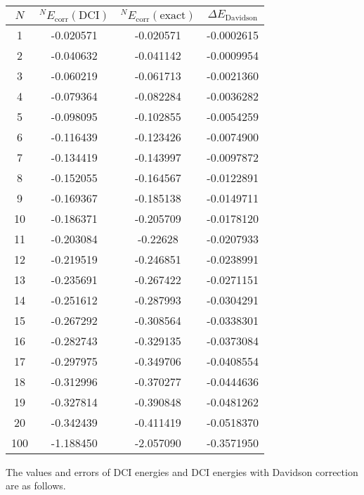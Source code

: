 \documentclass[a4paper]{article}
\DeclareMathOperator{\corr}{\mathrm{corr}}
\numberwithin{equation}{subsection}
\begin{document}
\begin{table}[H]
	\begin{tabular}{cccc}
	\hline
	\specialrule{0em}{1pt}{2pt}
	$ N $ & $ {^N E}_{\corr}(\text{DCI}) $ & $ {^N E}_{\corr}(\text{exact}) $ & $ \Delta E_{\text{Davidson}} $  \\ \hline
    1 & -0.020571	& -0.020571 &  -0.0002615 \\
    2 & -0.040632	& -0.041142 &  -0.0009954 \\
    3 & -0.060219	& -0.061713 &  -0.0021360	 \\
    4 & -0.079364	& -0.082284 &  -0.0036282	 \\
    5 & -0.098095	& -0.102855	 & -0.0054259	 \\
    6 & -0.116439	& -0.123426	 & -0.0074900	 \\
    7 & -0.134419	& -0.143997	 & -0.0097872	 \\
    8 & -0.152055	& -0.164567	 & -0.0122891	 \\
    9 & -0.169367	& -0.185138	 & -0.0149711	 \\
    10 & -0.186371	& -0.205709	 & -0.0178120	 \\
    11 & -0.203084	& -0.22628	 & -0.0207933	 \\
    12 & -0.219519	& -0.246851	 & -0.0238991	 \\
    13 & -0.235691	& -0.267422	 & -0.0271151	 \\
    14 & -0.251612	& -0.287993	 & -0.0304291	 \\
    15 & -0.267292	& -0.308564	 & -0.0338301	 \\
    16 & -0.282743	& -0.329135	 & -0.0373084	 \\
    17 & -0.297975	& -0.349706	 & -0.0408554	 \\
    18 & -0.312996	& -0.370277	 & -0.0444636	 \\
    19 & -0.327814	& -0.390848	 & -0.0481262	 \\
    20 & -0.342439	& -0.411419	 & -0.0518370	 \\
    100 & -1.188450 & -2.057090  & -0.3571950 \\ 
    \hline
	\end{tabular}
\end{table}
The values and errors of DCI energies and DCI energies with Davidson correction are as follows.
\end{document}
